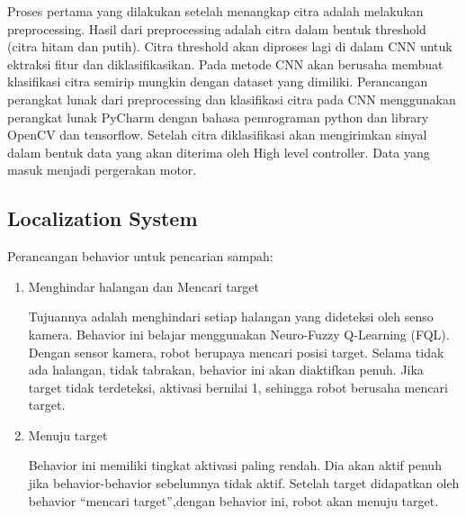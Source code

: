 

Proses pertama yang dilakukan setelah menangkap citra adalah melakukan preprocessing.
Hasil dari preprocessing adalah citra dalam bentuk threshold (citra hitam dan putih). Citra threshold akan diproses lagi di dalam CNN untuk ektraksi fitur dan diklasifikasikan. Pada metode CNN akan berusaha membuat klasifikasi citra semirip mungkin dengan dataset yang dimiliki. Perancangan perangkat lunak dari preprocessing dan klasifikasi citra pada CNN menggunakan perangkat lunak PyCharm dengan bahasa pemrograman python dan library OpenCV dan tensorflow.
Setelah citra diklasifikasi akan mengirimkan sinyal dalam bentuk data yang akan diterima oleh High level controller. Data
yang masuk menjadi pergerakan motor. 

\subsection{Localization System}




Perancangan behavior untuk pencarian sampah:

\begin{enumerate}
	\item Menghindar halangan dan Mencari target
	
 Tujuannya adalah menghindari setiap halangan yang dideteksi oleh senso kamera. Behavior ini belajar menggunakan Neuro-Fuzzy Q-Learning (FQL). 
Dengan sensor kamera, robot berupaya mencari posisi target. Selama tidak ada halangan, tidak tabrakan, behavior ini akan diaktifkan penuh. Jika target tidak terdeteksi, aktivasi bernilai 1, sehingga robot berusaha mencari target.

\item Menuju target

Behavior ini memiliki tingkat aktivasi paling rendah. Dia akan aktif penuh jika behavior-behavior sebelumnya tidak aktif. Setelah target didapatkan oleh behavior “mencari target”,dengan behavior ini, robot akan menuju target.

\end{enumerate}



